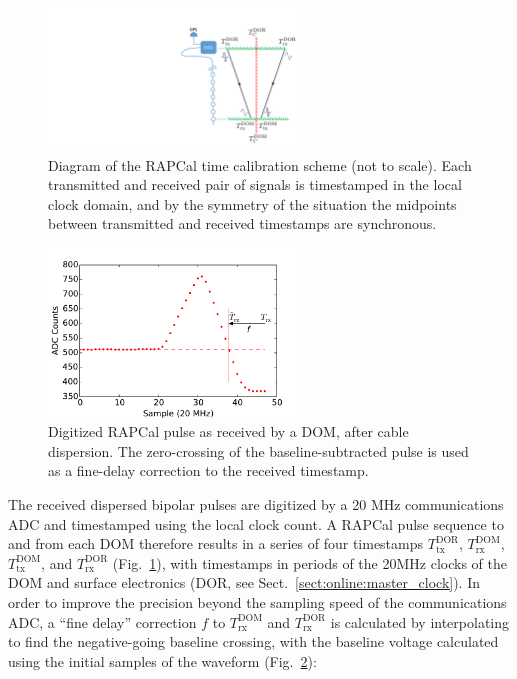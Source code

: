 \begin{figure}[!h]
 \centering
 \includegraphics[width=0.6\textwidth]{graphics/dom/rapcal/rapcal_symmetry.pdf}
 \caption{Diagram of the RAPCal time calibration scheme (not to scale).
   Each transmitted and received pair of signals is
   timestamped in the local clock domain, and by the symmetry of the
   situation the midpoints between transmitted and received timestamps are
   synchronous.} 
 \label{fig:rapcal_symmetry}
\end{figure}

\begin{figure}[h]
 \centering
 \includegraphics[width=0.6\textwidth]{graphics/dom/rapcal/dom_wf_zero_crossing.pdf}
 \caption{Digitized RAPCal pulse as received by a DOM, after cable dispersion.  The
   zero-crossing of the baseline-subtracted pulse is used as a fine-delay
   correction to the received timestamp.}
 \label{fig:rapcal_zero_crossing}
\end{figure}

The received dispersed bipolar pulses are digitized by a 20 MHz communications ADC and 
timestamped using the local clock count.  A RAPCal pulse sequence to and
from each DOM therefore results in a series of four timestamps 
$T_{\mathrm{tx}}^{\mathrm{DOR}}$, $T_{\mathrm{rx}}^{\mathrm{DOM}}$, 
$T_{\mathrm{tx}}^{\mathrm{DOM}}$,  and $T_{\mathrm{rx}}^{\mathrm{DOR}}$
(Fig.~\ref{fig:rapcal_symmetry}), with timestamps in periods
of the 20MHz clocks of the DOM and surface electronics (DOR, see
Sect.~\ref{sect:online:master_clock}).  In order to improve the precision
beyond the sampling speed of the communications ADC, a ``fine delay'' correction $f$ to
$T_{\mathrm{rx}}^{\mathrm{DOM}}$ and $T_{\mathrm{rx}}^{\mathrm{DOR}}$ is calculated by interpolating
to find the negative-going baseline crossing, with the baseline voltage
calculated using the initial samples of the waveform (Fig.~\ref{fig:rapcal_zero_crossing}):

